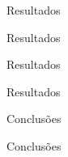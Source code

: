 \documentclass[10pt]{beamer}
\begin{document}
\begin{frame}{Resultados}
\end{frame}


\begin{frame}{Resultados}
\end{frame}


\begin{frame}{Resultados}
\end{frame}

\begin{frame}{Resultados}
\end{frame}

\begin{frame}{Conclusões}
\end{frame}

\begin{frame}{Conclusões}
\end{frame}
\end{document}
